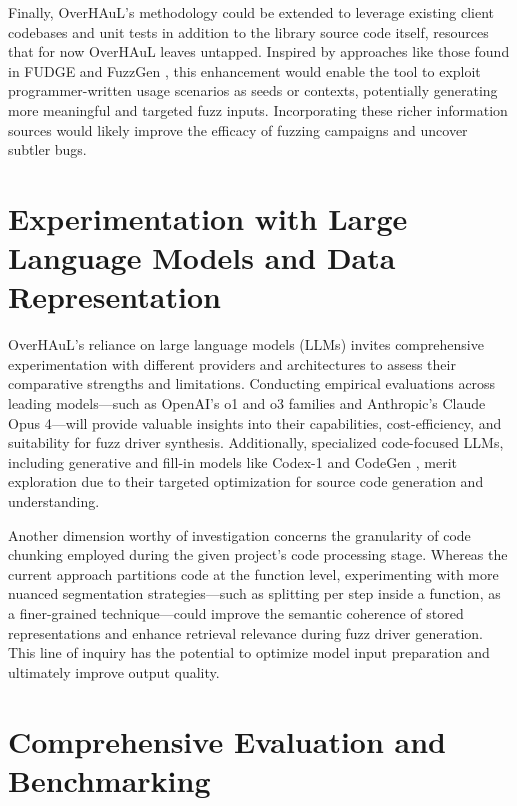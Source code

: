 \documentclass[
  a4paper,
]{scrreprt}
\theoremstyle{definition}
\theoremstyle{remark}
\begin{document}
Finally, OverHAuL's methodology could be extended to leverage existing
client codebases and unit tests in addition to the library source code
itself, resources that for now OverHAuL leaves untapped. Inspired by
approaches like those found in FUDGE and FuzzGen
\autocite{fuzzgen,fudge}, this enhancement would enable the tool to
exploit programmer-written usage scenarios as seeds or contexts,
potentially generating more meaningful and targeted fuzz inputs.
Incorporating these richer information sources would likely improve the
efficacy of fuzzing campaigns and uncover subtler bugs.

\section{Experimentation with Large Language Models and Data
Representation}\label{experimentation-with-large-language-models-and-data-representation}

OverHAuL's reliance on large language models (LLMs) invites
comprehensive experimentation with different providers and architectures
to assess their comparative strengths and limitations. Conducting
empirical evaluations across leading models---such as OpenAI's o1 and o3
families and Anthropic's Claude Opus 4---will provide valuable insights
into their capabilities, cost-efficiency, and suitability for fuzz
driver synthesis. Additionally, specialized code-focused LLMs, including
generative and fill-in models like Codex-1 and CodeGen
\autocite{nijkamp2023a,nijkamp2023,openai2025a}, merit exploration due
to their targeted optimization for source code generation and
understanding.

Another dimension worthy of investigation concerns the granularity of
code chunking employed during the given project's code processing stage.
Whereas the current approach partitions code at the function level,
experimenting with more nuanced segmentation strategies---such as
splitting per step inside a function, as a finer-grained
technique---could improve the semantic coherence of stored
representations and enhance retrieval relevance during fuzz driver
generation. This line of inquiry has the potential to optimize model
input preparation and ultimately improve output quality.

\section{Comprehensive Evaluation and
Benchmarking}\label{comprehensive-evaluation-and-benchmarking}
\end{document}
